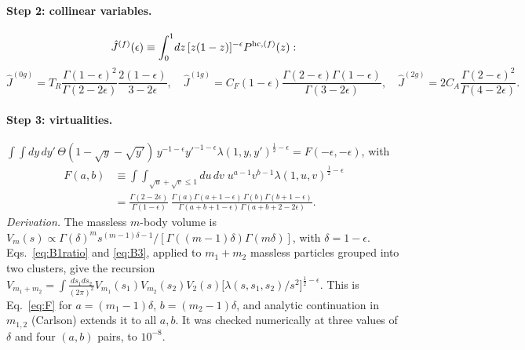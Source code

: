 \documentclass[11pt,a4paper]{article}
\newcommand{\eps}{\epsilon}
\begin{document}
\paragraph{Step 2: collinear variables.}
\begin{equation}
\hat J^{(f)}(\eps)\equiv\int_0^1\!dz\,[z(1-z)]^{-\eps}P^{{\rm hc},(f)}(z):
\end{equation}
\begin{equation}
\hat J^{(0g)}=T_R\frac{\Gamma(1-\eps)^2}{\Gamma(2-2\eps)}\frac{2(1-\eps)}{3-2\eps},\quad
\hat J^{(1g)}=C_F(1-\eps)\frac{\Gamma(2-\eps)\Gamma(1-\eps)}{\Gamma(3-2\eps)},\quad
\hat J^{(2g)}=2C_A\frac{\Gamma(2-\eps)^2}{\Gamma(4-2\eps)}.
\end{equation}

\paragraph{Step 3: virtualities.} $\displaystyle\int\!\!\int dy\,dy'\,\Theta(1-\sqrt y-\sqrt{y'})\,y^{-1-\eps}y'^{-1-\eps}\lambda(1,y,y')^{\frac12-\eps}=F(-\eps,-\eps)$, with
\begin{equation}
\boxed{\;\begin{aligned}
F(a,b)&\equiv\int\!\!\int_{\sqrt u+\sqrt v\le1}\!du\,dv\;u^{a-1}v^{b-1}\lambda(1,u,v)^{\frac12-\eps}\\
&=\frac{\Gamma(2-2\eps)}{\Gamma(1-\eps)}\,
\frac{\Gamma(a)\Gamma(a+1-\eps)\,\Gamma(b)\Gamma(b+1-\eps)}{\Gamma(a+b+1-\eps)\,\Gamma(a+b+2-2\eps)}.
\end{aligned}\;}
\label{eq:F}
\end{equation}
\textit{Derivation.} The massless $m$-body volume is $V_m(s)\propto\Gamma(\delta)^m s^{(m-1)\delta-1}/[\Gamma((m-1)\delta)\Gamma(m\delta)]$, with $\delta=1-\eps$.
Eqs.~\eqref{eq:B1ratio} and \eqref{eq:B3}, applied to $m_1+m_2$ massless particles grouped into two clusters, give the recursion
$V_{m_1+m_2}=\int\frac{ds_1ds_2}{(2\pi)^2}V_{m_1}(s_1)V_{m_2}(s_2)V_2(s)\big[\lambda(s,s_1,s_2)/s^2\big]^{\frac12-\eps}$.
This is Eq.~\eqref{eq:F} for $a=(m_1-1)\delta$, $b=(m_2-1)\delta$, and analytic continuation in $m_{1,2}$ (Carlson) extends it to all $a,b$.
It was checked numerically at three values of $\delta$ and four $(a,b)$ pairs, to $10^{-8}$.
\end{document}
